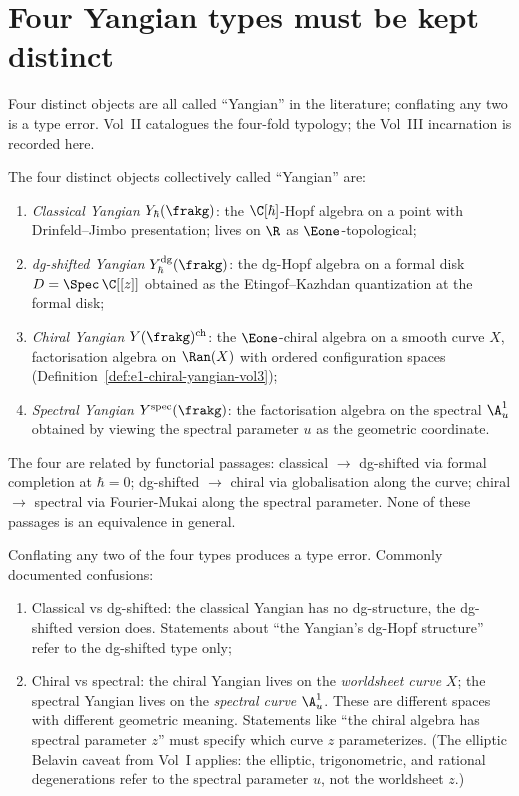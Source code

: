 \section{Four Yangian types must be kept distinct}
\label{sec:four-yangian-types}

Four distinct objects are all called ``Yangian'' in the literature;
conflating any two is a type error. Vol~II catalogues the
four-fold typology; the Vol~III incarnation is recorded here.

\begin{definition}
\label{def:four-yangian-types}
The four distinct objects collectively called ``Yangian'' are:
\begin{enumerate}[label=(\roman*)]
 \item \emph{Classical Yangian} $Y_\hbar(\frakg)$: the
 $\C[\hbar]$-Hopf algebra on a point with
 Drinfeld--Jimbo presentation; lives on $\R$ as
 $\Eone$-topological;
 \item \emph{dg-shifted Yangian} $Y_\hbar^{\mathrm{dg}}(\frakg)$:
 the dg-Hopf algebra on a formal disk $D = \Spec\,\C[[z]]$
 obtained as the Etingof--Kazhdan quantization at the formal
 disk;
 \item \emph{Chiral Yangian} $Y(\frakg)^{\mathrm{ch}}$: the
 $\Eone$-chiral algebra on a smooth curve $X$, factorisation
 algebra on $\Ran(X)$ with ordered configuration spaces
 (Definition~\ref{def:e1-chiral-yangian-vol3});
 \item \emph{Spectral Yangian} $Y^{\mathrm{spec}}(\frakg)$: the
 factorisation algebra on the spectral $\A^1_u$ obtained by
 viewing the spectral parameter $u$ as the geometric
 coordinate.
\end{enumerate}
The four are related by functorial passages: classical
$\to$ dg-shifted via formal completion at $\hbar = 0$;
dg-shifted $\to$ chiral via globalisation along the curve;
chiral $\to$ spectral via Fourier-Mukai along the spectral
parameter. None of these passages is an equivalence in
general.
\end{definition}

\begin{remark}
\label{rem:yangian-type-errors}
Conflating any two of the four types produces a type error.
Commonly documented confusions:
\begin{enumerate}[label=(\alph*)]
 \item Classical vs dg-shifted: the classical Yangian has no
 dg-structure, the dg-shifted version does. Statements about
 ``the Yangian's dg-Hopf structure'' refer to the dg-shifted
 type only;
 \item Chiral vs spectral: the chiral Yangian lives on the
 \emph{worldsheet curve} $X$; the spectral Yangian lives on
 the \emph{spectral curve} $\A^1_u$. These are different
 spaces with different geometric meaning. Statements like
 ``the chiral algebra has spectral parameter $z$'' must
 specify which curve $z$ parameterizes.
 (The elliptic Belavin caveat from Vol~I applies: the elliptic,
 trigonometric, and rational degenerations refer to the
 spectral parameter $u$, not the worldsheet $z$.)
\end{enumerate}
\end{remark}

